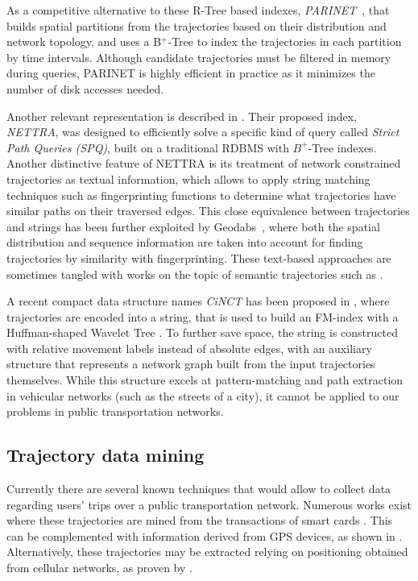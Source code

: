 \documentclass[runningheads]{llncs}
\begin{document}
As a competitive alternative to these R-Tree based indexes, {\em PARINET}~\cite{DBLP:journals/vldb/PopaZOBV11}, that builds spatial partitions from the trajectories based on their distribution and network topology, and uses a B$^+$-Tree to index the trajectories in each partition by time intervals. Although candidate trajectories must be filtered in memory during queries, PARINET is highly efficient in practice as it minimizes the number of disk accesses needed.

Another relevant representation is described in \cite{DBLP:conf/gis/KroghPTT14}. Their proposed index, {\em NETTRA}, was designed to efficiently solve a specific kind of query called {\em Strict Path Queries (SPQ)}, built on a traditional RDBMS with $B^+$-Tree indexes. Another distinctive feature of NETTRA is its treatment of network constrained trajectories as textual information, which allows to apply string matching techniques such as fingerprinting functions to determine what trajectories have similar paths on their traversed edges. This close equivalence between trajectories and strings has been further exploited by Geodabs~\cite{chapuis2018geodabs}, where both the spatial distribution and sequence information are taken into account for finding trajectories by similarity with fingerprinting. These text-based approaches are sometimes tangled with works on the topic of semantic trajectories such as \cite{al2017semantictraj}.


A recent compact data structure names {\em CiNCT} has been proposed in \cite{koide2018cinct}, where trajectories are encoded into a string, that is used to build an FM-index \cite{DBLP:conf/focs/FerraginaM00} with a Huffman-shaped Wavelet Tree \cite{ferragina2009compressed}. To further save space, the string is constructed with relative movement labels instead of absolute edges, with an auxiliary structure that represents a network graph built from the input trajectories themselves. While this structure excels at pattern-matching and path extraction in vehicular networks (such as the streets of a city), it cannot be applied to our problems in public transportation networks.

\subsection{Trajectory data mining}
Currently there are several known techniques that would allow to collect data regarding users' trips over a public transportation network. Numerous works exist where these trajectories are mined from the transactions of smart cards \cite{bhaskar2015passenger,wang2014aggregated}. This can be complemented with information derived from GPS devices, as shown in \cite{ma2014development}. Alternatively, these trajectories may be extracted relying on positioning obtained from cellular networks, as proven by \cite{liu2017exploring}.
\end{document}
